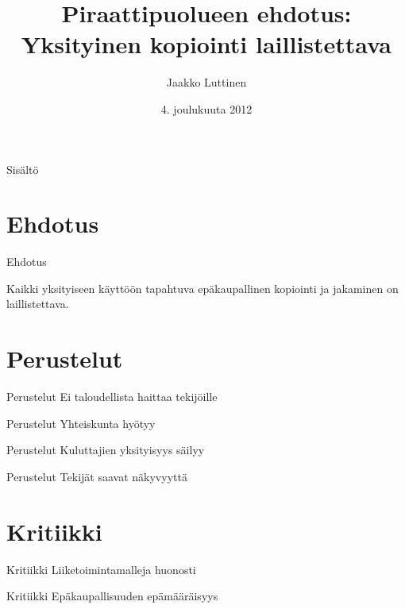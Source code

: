 \documentclass{beamer}
\title{Piraattipuolueen ehdotus:\\Yksityinen kopiointi laillistettava}
\author{
  Jaakko Luttinen
}
\date{4. joulukuuta 2012}
\begin{document}
\maketitle

\begin{frame}{Sisältö}
  \tableofcontents
\end{frame}


\section{Ehdotus}

\begin{frame}{Ehdotus}

  \Large Kaikki yksityiseen käyttöön tapahtuva epäkaupallinen
  kopiointi ja jakaminen on laillistettava.
  
\end{frame}

\section{Perustelut}

\begin{frame}{Perustelut}
  \Large
  Ei taloudellista haittaa tekijöille
\end{frame}

\begin{frame}{Perustelut}
  \Large
  Yhteiskunta hyötyy
\end{frame}

\begin{frame}{Perustelut}
  \Large
  Kuluttajien yksityisyys säilyy
\end{frame}

\begin{frame}{Perustelut}
  \Large
  Tekijät saavat näkyvyyttä
\end{frame}

\section{Kritiikki}

\begin{frame}{Kritiikki}
  \Large
  Liiketoimintamalleja huonosti
\end{frame}

\begin{frame}{Kritiikki}
  \Large 
  Epäkaupallisuuden epämääräisyys
\end{frame}
\end{document}
